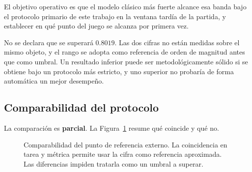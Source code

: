 El objetivo operativo es que el modelo clásico más fuerte alcance esa banda
bajo el protocolo primario de este trabajo en la ventana tardía de la
partida, y establecer en qué punto del juego se alcanza por primera vez.

No se declara que se superará $0.8019$. Las dos cifras no están medidas
sobre el mismo objeto, y el rango se adopta como referencia de orden de
magnitud antes que como umbral. Un resultado inferior puede ser
metodológicamente sólido si se obtiene bajo un protocolo más estricto, y uno
superior no probaría de forma automática un mejor desempeño.

\subsection{Comparabilidad del protocolo}
\label{subsec:comparabilidad}

La comparación es \textbf{parcial}. La
Figura~\ref{fig:comparabilidad} resume qué coincide y qué no.

\begin{figure}[!t]

\centering


\caption{Comparabilidad del punto de referencia externo. La coincidencia en
tarea y métrica permite usar la cifra como referencia aproximada. Las
diferencias impiden tratarla como un umbral a superar.}

\label{fig:comparabilidad}

\end{figure}

